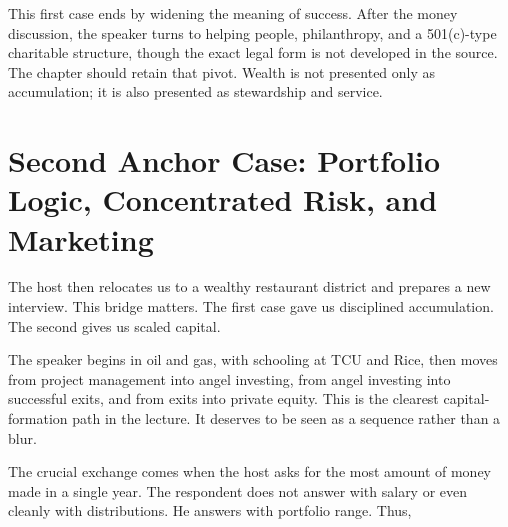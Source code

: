 This first case ends by widening the meaning of success. After the money discussion, the speaker turns to helping people, philanthropy, and a 501(c)-type charitable structure, though the exact legal form is not developed in the source. The chapter should retain that pivot. Wealth is not presented only as accumulation; it is also presented as stewardship and service.

\section{Second Anchor Case: Portfolio Logic, Concentrated Risk, and Marketing}

The host then relocates us to a wealthy restaurant district and prepares a new interview. This bridge matters. The first case gave us disciplined accumulation. The second gives us scaled capital.

The speaker begins in oil and gas, with schooling at TCU and Rice, then moves from project management into angel investing, from angel investing into successful exits, and from exits into private equity. This is the clearest capital-formation path in the lecture. It deserves to be seen as a sequence rather than a blur.

\begin{figure}[h]
\centering
{}
\end{figure}

The crucial exchange comes when the host asks for the most amount of money made in a single year. The respondent does not answer with salary or even cleanly with distributions. He answers with portfolio range. Thus,

